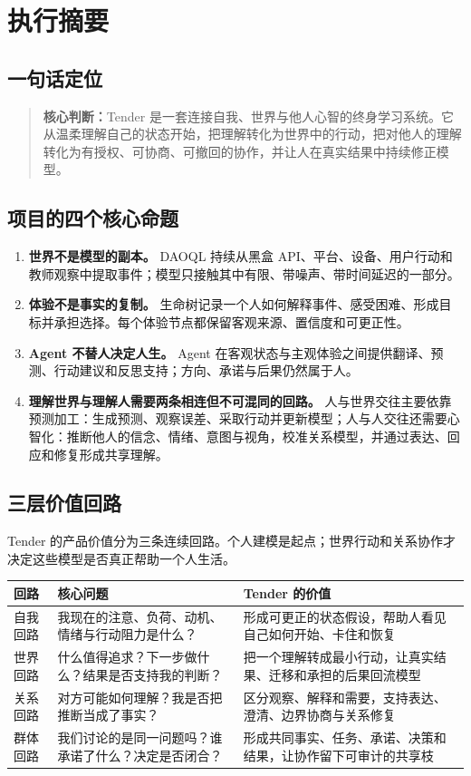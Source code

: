 \documentclass[UTF8,a4paper,11pt]{ctexart}
\newcommand{\keypoint}[1]{\begin{quote}\noindent\textbf{\color{TenderBlue}核心判断：}#1\end{quote}}
\begin{document}
\newpage
\section{执行摘要}

\subsection{一句话定位}

\keypoint{Tender 是一套连接自我、世界与他人心智的终身学习系统。它从温柔理解自己的状态开始，把理解转化为世界中的行动，把对他人的理解转化为有授权、可协商、可撤回的协作，并让人在真实结果中持续修正模型。}

\subsection{项目的四个核心命题}

\begin{enumerate}
\item \textbf{世界不是模型的副本。} DAOQL 持续从黑盒 API、平台、设备、用户行动和教师观察中提取事件；模型只接触其中有限、带噪声、带时间延迟的一部分。
\item \textbf{体验不是事实的复制。} 生命树记录一个人如何解释事件、感受困难、形成目标并承担选择。每个体验节点都保留客观来源、置信度和可更正性。
\item \textbf{Agent 不替人决定人生。} Agent 在客观状态与主观体验之间提供翻译、预测、行动建议和反思支持；方向、承诺与后果仍然属于人。
\item \textbf{理解世界与理解人需要两条相连但不可混同的回路。} 人与世界交往主要依靠预测加工：生成预测、观察误差、采取行动并更新模型；人与人交往还需要心智化：推断他人的信念、情绪、意图与视角，校准关系模型，并通过表达、回应和修复形成共享理解。
\end{enumerate}

\subsection{三层价值回路}

Tender 的产品价值分为三条连续回路。个人建模是起点；世界行动和关系协作才决定这些模型是否真正帮助一个人生活。

\begin{center}
\begin{longtable}{@{}p{2.8cm}p{4.2cm}p{5.8cm}@{}}
\toprule
\textbf{回路} & \textbf{核心问题} & \textbf{Tender 的价值} \\
\midrule
自我回路 & 我现在的注意、负荷、动机、情绪与行动阻力是什么？ & 形成可更正的状态假设，帮助人看见自己如何开始、卡住和恢复 \\
世界回路 & 什么值得追求？下一步做什么？结果是否支持我的判断？ & 把一个理解转成最小行动，让真实结果、迁移和承担的后果回流模型 \\
关系回路 & 对方可能如何理解？我是否把推断当成了事实？ & 区分观察、解释和需要，支持表达、澄清、边界协商与关系修复 \\
群体回路 & 我们讨论的是同一问题吗？谁承诺了什么？决定是否闭合？ & 形成共同事实、任务、承诺、决策和结果，让协作留下可审计的共享枝 \\
\bottomrule
\end{longtable}
\end{center}
\end{document}
